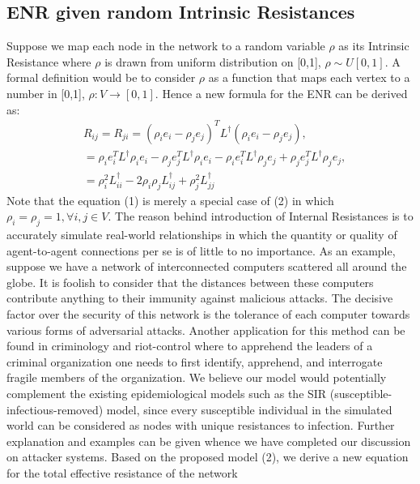 \documentclass{article}
\begin{document}
	\subsection{ENR given random Intrinsic Resistances}
	Suppose we map each node in the network to a random variable $\rho$ as its Intrinsic Resistance where $\rho$ is drawn from uniform distribution on [0,1], $\rho \sim U[0,1]$. A formal definition would be to consider $\rho$ as a function that maps each vertex to a number in [0,1], $\rho: V \rightarrow \left[ 0,1 \right]$. Hence a new formula for the ENR can be derived as:
	\begin{equation}
	\begin{aligned}
		&R_{ij} = R_{ji} = (\rho_i e_i - \rho_j e_j)^T L^{\dag} (\rho_i e_i - \rho_j e_j), \\
		&=\rho_i e_i^{T}L^{\dag}\rho_i e_i -\rho_j e_j^{T}L^{\dag}\rho_i e_i - \rho_i e_i^{T}L^{\dag}\rho_j e_j + \rho_j e_j^{T}L^{\dag}\rho_j e_j , \\
		&= \rho_i^{2} L_{ii}^{\dag} - 2\rho_i \rho_j L_{ij}^{\dag} + \rho_j^{2} L_{jj}^{\dag}
	\end{aligned}
	\end{equation}
	Note that the equation (1) is merely a special case of (2) in which $\rho_i = \rho_j = 1, \forall i,j \in V$. The reason behind introduction of Internal Resistances is to accurately simulate real-world relationships in which the quantity or quality of agent-to-agent connections per se is of little to no importance. As an example, suppose we have a network of interconnected computers scattered all around the globe. It is foolish to consider that the distances between these computers contribute anything to their immunity against malicious attacks. The decisive factor over the security of this network is the tolerance of each computer towards various forms of adversarial attacks. Another application for this method can be found in criminology and riot-control where to apprehend the leaders of a criminal organization one needs to first identify, apprehend, and interrogate fragile members of the organization. We believe our model would potentially complement the existing epidemiological models such as the SIR (susceptible-infectious-removed) model, since every susceptible individual in the simulated world can be considered as nodes with unique resistances to infection. Further explanation and examples can be given whence we have completed our discussion on attacker systems. Based on the proposed model (2), we derive a new equation for the total effective resistance of the network
\end{document}

